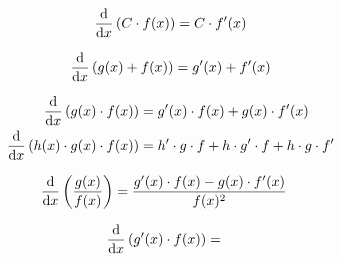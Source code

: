 \begin{boxleft}
\end{boxleft}\begin{boxrightshaded}
 \begin{align} 
\frac{\mathop{}\!\mathrm{d} }{\mathop{}\!\mathrm{d} x}\left(C\cdot f(x)\right)=C\cdot f'(x)
 \end{align}\end{boxrightshaded}

\begin{boxleft}
\end{boxleft}\begin{boxrightshaded}
 \begin{align} 
\frac{\mathop{}\!\mathrm{d} }{\mathop{}\!\mathrm{d} x}\left(g(x) + f(x)\right)=g'(x)+f'(x)
 \end{align}\end{boxrightshaded}

\begin{boxleft}
\end{boxleft}\begin{boxrightshaded}
 \begin{align} 
\frac{\mathop{}\!\mathrm{d} }{\mathop{}\!\mathrm{d} x}\left(g(x)\cdot f(x)\right)&=g'(x)\cdot f(x)+g(x)\cdot f'(x)\\
\frac{\mathop{}\!\mathrm{d} }{\mathop{}\!\mathrm{d} x}\left(h(x)\cdot g(x)\cdot f(x)\right)&=h'\cdot g\cdot f+h\cdot g'\cdot f+h\cdot g\cdot f'
 \end{align}\end{boxrightshaded}
            
\begin{boxleft}
\end{boxleft}\begin{boxrightshaded}
 \begin{align} 
\frac{\mathop{}\!\mathrm{d} }{\mathop{}\!\mathrm{d} x}\left(\frac{g(x)}{f(x)}\right)&=\frac{g'(x)\cdot f(x)-g(x)\cdot f'(x)}{f(x)^2}
 \end{align}\end{boxrightshaded}
            
\begin{boxleft}
\end{boxleft}\begin{boxrightshaded}
 \begin{align} 
\frac{\mathop{}\!\mathrm{d} }{\mathop{}\!\mathrm{d} x}\left(g'(x)\cdot f(x)\right)&=
 \end{align}\end{boxrightshaded}
            